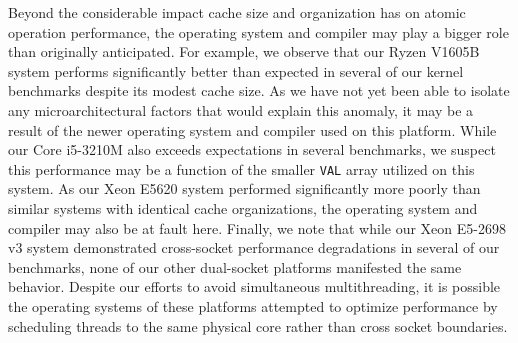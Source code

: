 Beyond the considerable impact cache size and organization has on atomic operation performance, the operating system and compiler may play a bigger role than originally anticipated.
For example, we observe that our Ryzen V1605B system performs significantly better than expected in several of our kernel benchmarks despite its modest cache size.
As we have not yet been able to isolate any microarchitectural factors that would explain this anomaly, it may be a result of the newer operating system and compiler used on this platform.
While our Core i5-3210M also exceeds expectations in several benchmarks, we suspect this performance may be a function of the smaller \texttt{VAL} array utilized on this system.
As our Xeon E5620 system performed significantly more poorly than similar systems with identical cache organizations, the operating system and compiler may also be at fault here.
Finally, we note that while our Xeon E5-2698 v3 system demonstrated cross-socket performance degradations in several of our benchmarks, none of our other dual-socket platforms manifested the same behavior.
Despite our efforts to avoid simultaneous multithreading, it is possible the operating systems of these platforms attempted to optimize performance by scheduling threads to the same physical core rather than cross socket boundaries.
